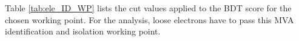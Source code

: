 Table \ref{tab:ele_ID_WP} lists the cut values applied to the BDT score for the chosen working point.
For the analysis, loose electrons have to pass this MVA identification and isolation working point.


